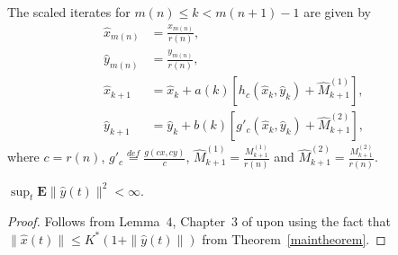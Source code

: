 The scaled iterates for $m(n)\leq k <m(n+1)-1$ are given by
\begin{subequations}\label{scaledttsarec}
\begin{align}
\hat{x}_{m(n)}&=\frac{x_{m(n)}}{r(n)},\\
\hat{y}_{m(n)}&=\frac{y_{m(n)}}{r(n)},\\
\hat{x}_{k+1}&=\hat{x}_k+a(k)[h_c(\hat{x}_k,\hat{y}_k)+\hat{M}^{(1)}_{k+1}],\\
\hat{y}_{k+1}&=\hat{y}_k+b(k)[{g}'_c(\hat{x}_k,\hat{y}_k)+\hat{M}^{(2)}_{k+1}],
\end{align}
\end{subequations}
where $c=r(n)$, $g'_c\stackrel{def}{=}\frac{g(cx,cy)}{c}$, $\hat{M}^{(1)}_{k+1}=\frac{{M}^{(1)}_{k+1}}{r(n)}$ and $\hat{M}^{(2)}_{k+1}=\frac{{M}^{(2)}_{k+1}}{r(n)}$.
\begin{lemma}\label{exbddy}
$\sup_t\mathbf{E}\parallel\hat{y}(t)\parallel^2<\infty$.
\end{lemma}
\begin{proof}
Follows from Lemma~$4$, Chapter~$3$ of \cite{SA} upon using the fact that $\parallel\hat{x}(t)\parallel
\leq K^*(1+\parallel \hat{y}(t)\parallel)$ from Theorem~\ref{maintheorem}. 
\end{proof}
